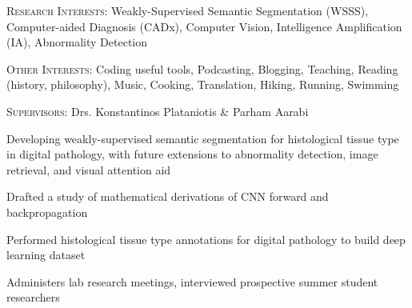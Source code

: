 \documentclass[12pt]{cv_style}
\begin{document}
\begin{ditem}
	\item \textsc{Research Interests:} Weakly-Supervised Semantic Segmentation (WSSS), Computer-aided Diagnosis (CADx), Computer Vision, Intelligence Amplification (IA), Abnormality Detection
	\item \textsc{Other Interests:} Coding useful tools, Podcasting, Blogging, Teaching, Reading (history, philosophy), Music, Cooking, Translation, Hiking, Running, Swimming
\end{ditem}

\newpage
\textsc{Supervisors:} Drs. Konstantinos Plataniotis \& Parham Aarabi
\begin{ditem}
	\item Developing weakly-supervised semantic segmentation for histological tissue type in digital pathology, with future extensions to abnormality detection, image retrieval, and visual attention aid
	\item Drafted a study of mathematical derivations of CNN forward and backpropagation
	\item Performed histological tissue type annotations for digital pathology to build deep learning dataset
	\item Administers lab research meetings, interviewed prospective summer student researchers
\end{ditem}
\end{document}
